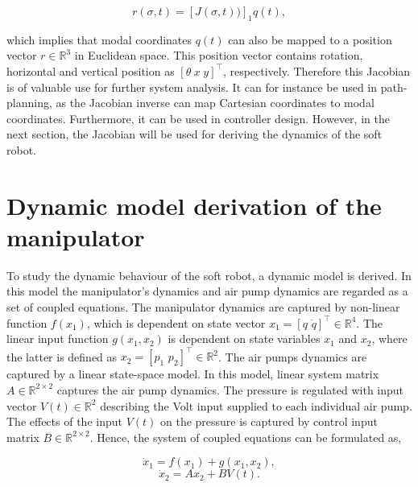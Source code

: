 \begin{equation}
    r(\sigma,t) = [J(\sigma,t))]_1q(t),
\end{equation}

which implies that modal coordinates $q(t)$ can also be mapped to a position vector $r\in \mathbb{R}^3$ in Euclidean space. This position vector contains rotation, horizontal and vertical position as $[\theta \hspace{3pt} x \hspace{3pt} y]^\top$, respectively. Therefore this Jacobian is of valuable use for further system analysis. It can for instance be used in path-planning, as the Jacobian inverse can map Cartesian coordinates to modal coordinates. Furthermore, it can be used in controller design. However, in the next section, the Jacobian will be used for deriving the dynamics of the soft robot. 


\section{Dynamic model derivation of the manipulator}

To study the dynamic behaviour of the soft robot, a dynamic model is derived. In this model the manipulator's dynamics and air pump dynamics are regarded as a set of coupled equations. The manipulator dynamics are captured by non-linear function $f(x_1)$, which is dependent on state vector $x_1 = [ q \hspace{4pt} \dot{q} ]^\top \in \mathbb{R}^4$. The linear input function $g(x_1,x_2)$ is dependent on state variables $x_1$ and $x_2$, where the latter is defined as $x_2 = [p_1 \hspace{4pt} p_2]^\top \in \mathbb{R}^2$. The air pumps dynamics are captured by a linear state-space model. In this model, linear system matrix $A \in \mathbb{R}^{2\times 2}$ captures the air pump dynamics. The pressure is regulated with input vector $V(t) \in \mathbb{R}^2$ describing the Volt input supplied to each individual air pump. The effects of the input $V(t)$ on the pressure is captured by control input matrix $B \in \mathbb{R}^{2\times2}$. Hence, the system of coupled equations can be formulated as,




\begin{equation}
    \dot{x}_1  = f(x_1) + g(x_1,x_2), 
       \label{eq2:nonlineq1}
    \end{equation}
    \begin{equation}
    \dot{x}_2 = Ax_2 + BV(t). 
    \label{eq2:nonlineq2}
\end{equation}

